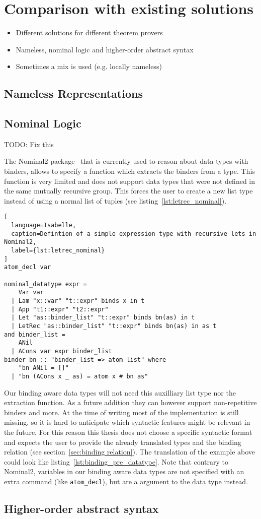 \chapter{Comparison with existing solutions}\label{chapter:comparison}

\begin{itemize}
\item{Different solutions for different theorem provers}
\item{Nameless, nominal logic and higher-order abstract syntax}
\item{Sometimes a mix is used (e.g. locally nameless)}
\end{itemize}

\section{Nameless Representations}

\section{Nominal Logic}

TODO: Fix this

The Nominal2 package~\cite{nominal2} that is currently used to reason about data types with binders, allows to specify a function which extracts the binders from a type. This function is very limited and does not support data types that were not defined in the same mutually recursive group. This forces the user to create a new list type instead of using a normal list of tuples (see listing~\ref{lst:letrec_nominal}).

\begin{lstlisting}[
  language=Isabelle,
  caption=Defintion of a simple expression type with recursive lets in Nominal2,
  label={lst:letrec_nominal}
]
atom_decl var

nominal_datatype expr =
    Var var
  | Lam "x::var" "t::expr" binds x in t
  | App "t1::expr" "t2::expr"
  | Let "as::binder_list" "t::expr" binds bn(as) in t
  | LetRec "as::binder_list" "t::expr" binds bn(as) in as t
and binder_list =
    ANil
  | ACons var expr binder_list
binder bn :: "binder_list => atom list" where
    "bn ANil = []"
  | "bn (ACons x _ as) = atom x # bn as"
\end{lstlisting}

Our binding aware data types will not need this auxilliary list type nor the extraction function. As a future addition they can however support non-repetitive binders and more. At the time of writing most of the implementation is still missing, so it is hard to anticipate which syntactic features might be relevant in the future. For this reason this thesis does not choose a specific syntactic format and expects the user to provide the already translated types and the binding relation (see section~\ref{sec:binding relation}). The translation of the example above could look like listing~\ref{lst:binding_pre_datatype}. Note that contrary to Nominal2, variables in our binding aware data types are not specified with an extra command (like \texttt{atom\_decl}), but are a argument to the data type instead.

\section{Higher-order abstract syntax}


